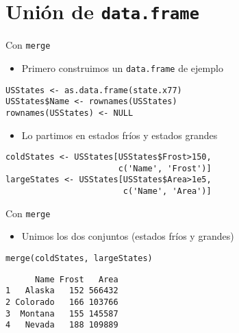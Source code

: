 \documentclass[xcolor={usenames,svgnames,dvipsnames}]{beamer}
\begin{document}
\section{Unión de \texttt{data.frame}}
\label{sec-5}
\begin{frame}[fragile,label=sec-5-1]{Con \texttt{merge}}
 \begin{itemize}
\item Primero construimos un \texttt{data.frame} de ejemplo
\end{itemize}
\lstset{language=R,label= ,caption= ,numbers=none}
\begin{lstlisting}
USStates <- as.data.frame(state.x77)
USStates$Name <- rownames(USStates)
rownames(USStates) <- NULL
\end{lstlisting}

\begin{itemize}
\item Lo partimos en estados \guillemotleft{}fríos\guillemotright{} y estados \guillemotleft{}grandes\guillemotright{}
\end{itemize}
\lstset{language=R,label= ,caption= ,numbers=none}
\begin{lstlisting}
coldStates <- USStates[USStates$Frost>150,
                       c('Name', 'Frost')]
largeStates <- USStates[USStates$Area>1e5,
                        c('Name', 'Area')]
\end{lstlisting}
\end{frame}

\begin{frame}[fragile,label=sec-5-2]{Con \texttt{merge}}
 \begin{itemize}
\item Unimos los dos conjuntos (estados \guillemotleft{}fríos\guillemotright{} y \guillemotleft{}grandes\guillemotright{})
\end{itemize}
\lstset{language=R,label= ,caption= ,numbers=none}
\begin{lstlisting}
merge(coldStates, largeStates)
\end{lstlisting}

\begin{verbatim}
      Name Frost   Area
1   Alaska   152 566432
2 Colorado   166 103766
3  Montana   155 145587
4   Nevada   188 109889
\end{verbatim}
\end{frame}
\end{document}

